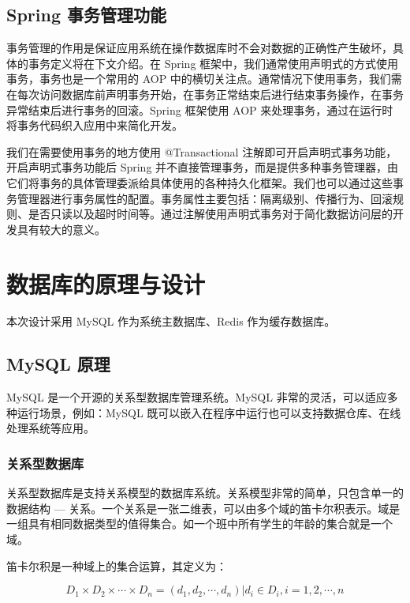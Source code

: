  \subsection{Spring 事务管理功能}
 
 事务管理的作用是保证应用系统在操作数据库时不会对数据的正确性产生破坏，具体的事务定义将在下文介绍。在 Spring 框架中，我们通常使用声明式的方式使用事务，事务也是一个常用的 AOP 中的横切关注点。通常情况下使用事务，我们需在每次访问数据库前声明事务开始，在事务正常结束后进行结束事务操作，在事务异常结束后进行事务的回滚。Spring 框架使用 AOP 来处理事务，通过在运行时将事务代码织入应用中来简化开发。
 
 我们在需要使用事务的地方使用 @Transactional 注解即可开启声明式事务功能，开启声明式事务功能后 Spring 并不直接管理事务，而是提供多种事务管理器，由它们将事务的具体管理委派给具体使用的各种持久化框架。我们也可以通过这些事务管理器进行事务属性的配置。事务属性主要包括：隔离级别、传播行为、回滚规则、是否只读以及超时时间等。通过注解使用声明式事务对于简化数据访问层的开发具有较大的意义。


\section{数据库的原理与设计}

本次设计采用 MySQL 作为系统主数据库、Redis 作为缓存数据库。

\subsection{MySQL 原理}
MySQL 是一个开源的关系型数据库管理系统。MySQL 非常的灵活，可以适应多种运行场景，例如：MySQL 既可以嵌入在程序中运行也可以支持数据仓库、在线处理系统等应用。

\subsubsection{关系型数据库}
关系型数据库是支持关系模型的数据库系统。关系模型非常的简单，只包含单一的数据结构 --- 关系。一个关系是一张二维表，可以由多个域的笛卡尔积表示。域是一组具有相同数据类型的值得集合。如一个班中所有学生的年龄的集合就是一个域。

笛卡尔积是一种域上的集合运算，其定义为：

\begin{equation}
\label{eq:Descartes}
D_1 \times D_2 \times \cdots \times D_n = {(d_1, d_2, \cdots, d_n) | d_i \in D_i, i=1, 2, \cdots, n}
\end{equation}

